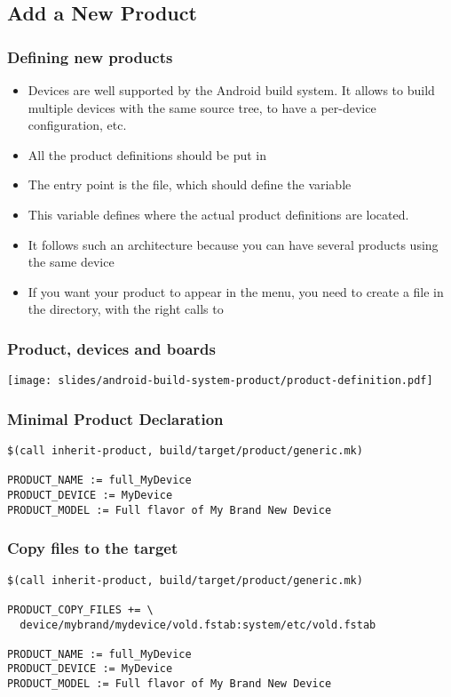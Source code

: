 \subsection{Add a New Product}

\begin{frame}
  \frametitle{Defining new products}
  \begin{itemize}
  \item Devices are well supported by the Android build system. It allows
    to build multiple devices with the same source tree, to have a
    per-device configuration, etc.
  \item All the product definitions should be put in
  \item The entry point is the  file, which
    should define the  variable
  \item This variable defines where the actual product definitions are
    located.
  \item It follows such an architecture because you can have several
    products using the same device
  \item If you want your product to appear in the  menu, you need
    to create a  file in the  directory,
    with the right calls to 
  \end{itemize}
\end{frame}

\begin{frame}
  \frametitle{Product, devices and boards}
  \begin{center}
    \texttt{[image: slides/android-build-system-product/product-definition.pdf]}
  \end{center}
\end{frame}

\begin{frame}[fragile]
  \frametitle{Minimal Product Declaration}
\begin{verbatim}
$(call inherit-product, build/target/product/generic.mk)

PRODUCT_NAME := full_MyDevice
PRODUCT_DEVICE := MyDevice
PRODUCT_MODEL := Full flavor of My Brand New Device
\end{verbatim}
\end{frame}

\begin{frame}[fragile]
  \frametitle{Copy files to the target}
\begin{verbatim}
$(call inherit-product, build/target/product/generic.mk)

PRODUCT_COPY_FILES += \
  device/mybrand/mydevice/vold.fstab:system/etc/vold.fstab

PRODUCT_NAME := full_MyDevice
PRODUCT_DEVICE := MyDevice
PRODUCT_MODEL := Full flavor of My Brand New Device
\end{verbatim}
\end{frame}

